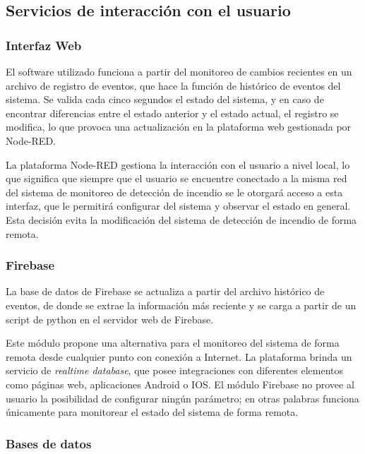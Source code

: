 
\subsection{Servicios de interacción con el usuario}

\subsubsection{Interfaz Web}

El software utilizado funciona a partir del monitoreo de cambios recientes en un archivo de registro de eventos, que hace la función de histórico de eventos del sistema. Se valida cada cinco segundos el estado del sistema, y en caso de encontrar diferencias entre el estado anterior y el estado actual, el registro se modifica, lo que provoca una actualización en la plataforma web gestionada por Node-RED.  

La plataforma Node-RED gestiona la interacción con el usuario a nivel local, lo que significa que siempre que el usuario se encuentre conectado a la misma red del sistema de monitoreo de detección de incendio se le otorgará acceso a esta interfaz, que le permitirá configurar del sistema y observar el estado en general. Esta decisión evita la modificación del sistema de detección de incendio de forma remota.         

\subsubsection{Firebase}

La base de datos de Firebase se actualiza a partir del archivo histórico de eventos, de donde se extrae la información más reciente y se carga a partir de un script de python en el servidor web de Firebase.

Este módulo propone una alternativa para el monitoreo del sistema de forma remota desde cualquier punto con conexión a  Internet. La plataforma brinda un servicio de \textit{realtime database}, que posee integraciones con diferentes elementos como páginas web, aplicaciones Android o IOS. El módulo Firebase no provee al usuario la posibilidad de configurar ningún parámetro; en otras palabras funciona únicamente para monitorear el estado del sistema de forma remota.

\subsubsection{Bases de datos}

